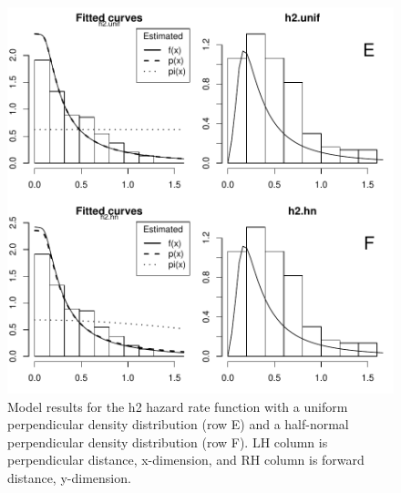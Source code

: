 \documentclass{article}
\begin{document}
\begin{figure}
\begin{center}
\includegraphics{WC86R1-figmod3}
\end{center}
\caption{Model results for the h2 hazard rate function with a uniform perpendicular density distribution (row E) and a half-normal perpendicular density distribution (row F). LH column is perpendicular distance, x-dimension, and RH column is forward distance, y-dimension.}
\label{fig:mod5and6}
\end{figure}
\clearpage
\end{document}
